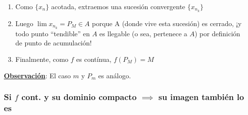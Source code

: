 {\begin{enumerate}
\begin{enumerate}
			\begin{itemize}
				 \item O sea: $\lim f(x_n) = \lim y_n = M$
			\end{itemize}
			\item Como $\{x_n\}$ acotada, extraemos una sucesión convergente $\{x_{n_k}\}$
			\item Luego $\lim x_{n_k}=P_M \in A$ porque A (donde vive esta sucesión) es cerrado, ¡y todo punto ``tendible'' en $A$ es llegable (o sea, pertenece a $A$) por definición de punto de acumulación!
			\item Finalmente, como $f$ es contínua, $f(P_M)=M$
		\end{enumerate}
	\end{enumerate}	
	\noindent \textbf{\underline{Observación}}: El caso $m$ y $P_m$ es análogo.
}

\subsubsection{Si $f$ cont. y su dominio compacto $\implies$ su imagen también lo es}
